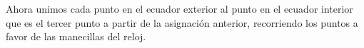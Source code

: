 Ahora unimos cada punto en el ecuador exterior al punto en el ecuador interior que es el tercer punto a partir de la asignación anterior, recorriendo los puntos a favor de las manecillas del reloj.

